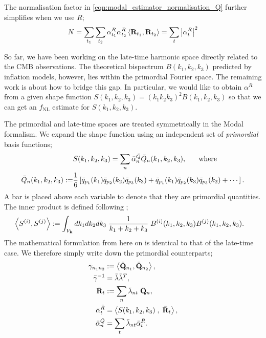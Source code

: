 The normalisation factor in \eqref{eqn:modal_estimator_normalisation_Q} further simplifies when we use $R$;
\begin{align}
	N = \sum_{t_1} \sum_{t_2} \alpha^R_{t_1} \alpha^R_{t_2} \left< \mathbf{R}_{t_1}, \mathbf{R}_{t_2} \right> = \sum_t \left| \alpha^R_{t} \right|^2 \label{eqn:modal_estimator_normalisation_R}
\end{align}

\hspace{10pt}

So far, we have been working on the late-time harmonic space directly related to the CMB observations. The theoretical bispectrum $B(k_1,k_2,k_3)$ predicted by inflation models, however, lies within the primordial Fourier space. The remaining work is about how to bridge this gap. In particular, we would like to obtain $\alpha^R$ from a given shape function $S(k_1,k_2,k_3) = (k_1 k_2 k_3)^2 B(k_1, k_2, k_3)$ so that we can get an $f_\text{NL}$ estimate for $S(k_1,k_2,k_3)$.

The primordial and late-time spaces are treated symmetrically in the Modal formalism. We expand the shape function using an independent set of \textit{primordial} basis functions;
\begin{align}
	&S(k_1,k_2,k_3) = \sum_n \bar{\alpha}^{\bar{Q}}_n \bar{Q}_n (k_1, k_2, k_3), \hspace{0.05\textwidth} \text{where}\\
	\bar{Q}_{n} (k_1, k_2, k_3) := &\frac{1}{6} \left[ \bar{q}_{p_1}(k_1) \bar{q}_{p_2}(k_2) \bar{q}_{p_3}(k_3) + \bar{q}_{p_1}(k_1) \bar{q}_{p_2}(k_3) \bar{q}_{p_3}(k_2) + \cdots \right].
\end{align}
A bar is placed above each variable to denote that they are primordial quantities. The inner product is defined following \cite{Fergusson2010general};
\begin{align}
	\left< S^{(i)}, S^{(j)} \right> &:= \int_{V_\mathbf{k}} dk_1 dk_2 dk_3 \; \frac{1}{k_1+k_2+k_3} \; B^{(i)}(k_1, k_2, k_3) B^{(j)}(k_1, k_2, k_3).
\end{align}
The mathematical formulation from here on is identical to that of the late-time case. We therefore simply write down the primordial counterparts;
\begin{align}
	\bar{\gamma}_{n_1 n_2} &:=  \left< \bar{\mathbf{Q}}_{n_1} , \bar{\mathbf{Q}}_{n_2} \right>, \\
	\bar{\gamma}^{-1} &= \bar{\lambda} \bar{\lambda}^T, \\
	\bar{\mathbf{R}}_t &:= \sum_n \bar{\lambda}_{nt} \; \bar{\mathbf{Q}}_{n}, \\
	\bar{\alpha}^{\bar{R}}_t &= \left< S(k_1,k_2,k_3) \;,\; \bar{\mathbf{R}}_t \right>, \\
	\bar{\alpha}^{\bar{Q}}_n &= \sum_t \bar{\lambda}_{nt} \bar{\alpha}^{\bar{R}}_t.
\end{align}

